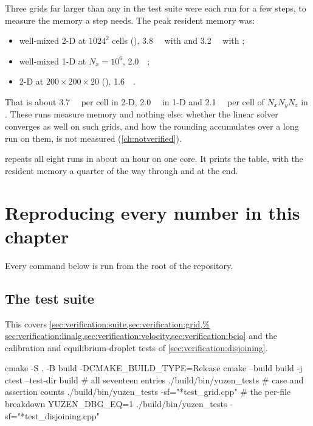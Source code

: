 Three grids far larger than any in the test suite were each run for a few
steps, to measure the memory a step needs. The peak resident memory was:
\begin{itemize}
  \item well-mixed 2-D at $1024^{2}$ cells (),
    \SI{3.8}{\giga\byte} with  and \SI{3.2}{\giga\byte} with
    ;
  \item well-mixed 1-D at $N_x = 10^{6}$, \SI{2.0}{\giga\byte};
  \item {} 2-D at $200 \times 200 \times 20$ (),
    \SI{1.6}{\giga\byte}.
\end{itemize}
That is about \SI{3.7}{\kilo\byte} per cell in 2-D, \SI{2.0}{\kilo\byte} in
1-D and \SI{2.1}{\kilo\byte} per cell of $N_x N_y N_z$ in . These
runs measure memory and nothing else: whether the linear solver converges as
well on such grids, and how the rounding accumulates over a long run on them,
is not measured (\cref{ch:notverified}).

repeats all eight runs in about an hour on one core. It prints the table,
with the resident memory a quarter of the way through and at the end.

\section{Reproducing every number in this chapter}
\label{sec:verification:reproduce}

Every command below is run from the root of the repository.

\subsection{The test suite}

This covers \cref{sec:verification:suite,sec:verification:grid,%
sec:verification:linalg,sec:verification:velocity,sec:verification:bcio} and
the calibration and equilibrium-droplet tests of
\cref{sec:verification:disjoining}.

\begin{shell}
cmake -S . -B build -DCMAKE_BUILD_TYPE=Release
cmake --build build -j
ctest --test-dir build                        # all seventeen entries
./build/bin/yuzen_tests                       # case and assertion counts
./build/bin/yuzen_tests -sf="*test_grid.cpp"  # the per-file breakdown
YUZEN_DBG_EQ=1 ./build/bin/yuzen_tests -sf="*test_disjoining.cpp"
\end{shell}

